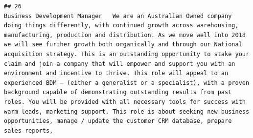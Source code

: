 \documentclass[11pt,a4paper,]{article}
\begin{document}
\begin{verbatim}
## 26                                                                                                                                                                                                                                                                                                                                                                                                                                                                                                                                                                                                                                                                                                                                                                                                                                                                                                                                                                                                                                                                                                                                                                                                                                                                                                                                                                                                                                                                                                                                                                                                                                                                                                                                                                                                                                                                                                                                                                                                                                                                                                                                                                                                                                                                                                                                                                                                                                                                                                                                                                        Business Development Manager   We are an Australian Owned company doing things differently, with continued growth across warehousing, manufacturing, production and distribution. As we move well into 2018 we will see further growth both organically and through our National acquisition strategy. This is an outstanding opportunity to stake your claim and join a company that will empower and support you with an environment and incentive to thrive. This role will appeal to an experienced BDM – (either a generalist or a specialist), with a proven background capable of demonstrating outstanding results from past roles. You will be provided with all necessary tools for success with warm leads, marketing support. This role is about seeking new business opportunities, manage / update the customer CRM database, prepare sales reports, 
\end{verbatim}
\end{document}
